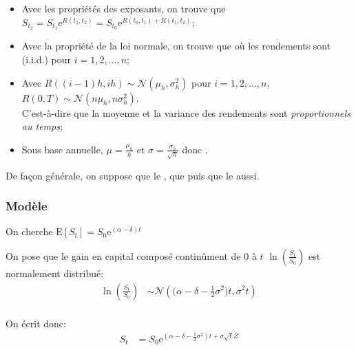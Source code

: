 \documentclass[10pt, french]{article}
\begin{document}
\begin{multicols*}{2}
\begin{itemize}
	\item	Avec les propriétés des exposants, on trouve que $S_{t_{2}}	=	S_{t_{1}}\textrm{e}^{R(t_{1}, t_{2})}	=	S_{t_{0}}\textrm{e}^{R(t_{0}, t_{1}) + R(t_{1}, t_{2})}$;
	\item	Avec la propriété de la loi normale, on trouve que  où les rendements sont (i.i.d.) pour $i	=	1, 2, \dots, n$;
	\item	Avec $R\left((i	-	1)h, ih\right) \sim \mathcal{N}(\mu_{h}, \sigma^{2}_{h})$ pour $i	=	1, 2, \dots, n$, $R(0, T) \sim \mathcal{N}(n\mu_{h}, n\sigma^{2}_{h})$.	\\
			C'est-à-dire que la moyenne et la variance des rendements sont \textit{proportionnels au temps};	
	\item	Sous base annuelle, $\mu =	\frac{\mu_{h}}{h}$ et $\sigma =	\frac{\sigma_{h}}{\sqrt{h}}$ donc .
\end{itemize}

De façon générale, on suppose que le , que  puis que le  aussi.

\subsubsection*{Modèle}
On cherche $\text{E}[S_{t}]	=	S_{0}\textrm{e}^{(\alpha - \delta)t}$


\begin{definitionNOHFILL}[Distribution]
On pose que le gain en capital composé continûment de $0$ à $t$ $\ln\left(\frac{S_{t}}{S_{0}}\right)$ est normalement distribué: \\
\begin{align*}
	\ln\left(\frac{S_{t}}{S_{0}}\right) 
	&\sim	\mathcal{N}\left(\Big(\alpha - \delta - \frac{1}{2}\sigma^{2}\Big)t, \sigma^{2}t\right)	\\
\end{align*}

On écrit donc:
\begin{align*}
	S_{t} 
	&=	S_{0}\textrm{e}^{(\alpha - \delta - \frac{1}{2}\sigma^{2})t + \sigma\sqrt{t}Z}
\end{align*}
\end{definitionNOHFILL}


\end{multicols*}
\end{document}
